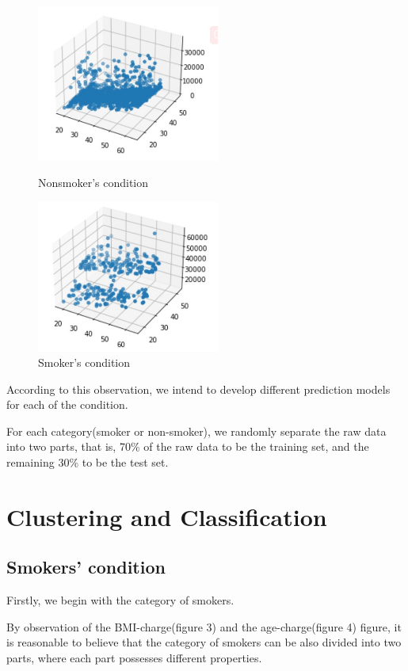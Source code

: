 \documentclass[12pt,a4paper]{article}
\begin{document}
\begin{figure}[H]
\centering
\begin{minipage}[t]{0.48\textwidth}
\centering
\includegraphics[width=6cm]{nonsmokeroverall.jpg}
\caption{Nonsmoker's condition}
\end{minipage}
\begin{minipage}[t]{0.48\textwidth}
\centering
\includegraphics[width=6cm]{smokeroverall.jpg}
\caption{Smoker's condition}
\end{minipage}
\end{figure}

According to this observation, we intend to develop different prediction models for each of the condition. 
\par For each category(smoker or non-smoker), we randomly separate the raw data into two parts, that is, 70\% of the raw data to be the training set, and the remaining 30\% to be the test set.

\section{Clustering and Classification}
\subsection{Smokers' condition}
Firstly, we begin with the category of smokers.\par 
By observation of the BMI-charge(figure 3) and the age-charge(figure 4) figure, it is reasonable to believe that the category of smokers can be also divided into two parts, where each part possesses different properties. 
\end{document}
